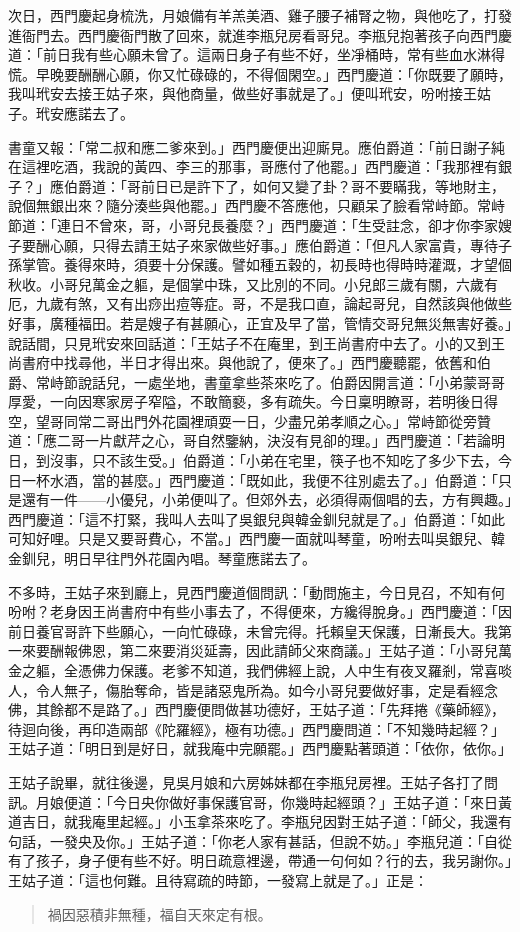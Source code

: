 次日，西門慶起身梳洗，月娘備有羊羔美酒、雞子腰子補腎之物，與他吃了，打發進衙門去。西門慶衙門散了回來，就進李瓶兒房看哥兒。李瓶兒抱著孩子向西門慶道：「前日我有些心願未曾了。這兩日身子有些不好，坐凈桶時，常有些血水淋得慌。早晚要酬酬心願，你又忙碌碌的，不得個閑空。」西門慶道：「你既要了願時，我叫玳安去接王姑子來，與他商量，做些好事就是了。」便叫玳安，吩咐接王姑子。玳安應諾去了。

書童又報：「常二叔和應二爹來到。」西門慶便出迎廝見。應伯爵道：「前日謝子純在這裡吃酒，我說的黃四、李三的那事，哥應付了他罷。」西門慶道：「我那裡有銀子？」應伯爵道：「哥前日已是許下了，如何又變了卦？哥不要瞞我，等地財主，說個無銀出來？隨分湊些與他罷。」西門慶不答應他，只顧呆了臉看常峙節。常峙節道：「連日不曾來，哥，小哥兒長養麼？」西門慶道：「生受註念，卻才你李家嫂子要酬心願，只得去請王姑子來家做些好事。」應伯爵道：「但凡人家富貴，專待子孫掌管。養得來時，須要十分保護。譬如種五穀的，初長時也得時時灌溉，才望個秋收。小哥兒萬金之軀，是個掌中珠，又比別的不同。小兒郎三歲有關，六歲有厄，九歲有煞，又有出痧出痘等症。哥，不是我口直，論起哥兒，自然該與他做些好事，廣種福田。若是嫂子有甚願心，正宜及早了當，管情交哥兒無災無害好養。」說話間，只見玳安來回話道：「王姑子不在庵里，到王尚書府中去了。小的又到王尚書府中找尋他，半日才得出來。與他說了，便來了。」西門慶聽罷，依舊和伯爵、常峙節說話兒，一處坐地，書童拿些茶來吃了。伯爵因開言道：「小弟蒙哥哥厚愛，一向因寒家房子窄隘，不敢簡褻，多有疏失。今日稟明瞭哥，若明後日得空，望哥同常二哥出門外花園裡頑耍一日，少盡兄弟孝順之心。」常峙節從旁贊道：「應二哥一片獻芹之心，哥自然鑒納，決沒有見卻的理。」西門慶道：「若論明日，到沒事，只不該生受。」伯爵道：「小弟在宅里，筷子也不知吃了多少下去，今日一杯水酒，當的甚麼。」西門慶道：「既如此，我便不往別處去了。」伯爵道：「只是還有一件——小優兒，小弟便叫了。但郊外去，必須得兩個唱的去，方有興趣。」西門慶道：「這不打緊，我叫人去叫了吳銀兒與韓金釧兒就是了。」伯爵道：「如此可知好哩。只是又要哥費心，不當。」西門慶一面就叫琴童，吩咐去叫吳銀兒、韓金釧兒，明日早往門外花園內唱。琴童應諾去了。

不多時，王姑子來到廳上，見西門慶道個問訊：「動問施主，今日見召，不知有何吩咐？老身因王尚書府中有些小事去了，不得便來，方纔得脫身。」西門慶道：「因前日養官哥許下些願心，一向忙碌碌，未曾完得。托賴皇天保護，日漸長大。我第一來要酬報佛恩，第二來要消災延壽，因此請師父來商議。」王姑子道：「小哥兒萬金之軀，全憑佛力保護。老爹不知道，我們佛經上說，人中生有夜叉羅剎，常喜啖人，令人無子，傷胎奪命，皆是諸惡鬼所為。如今小哥兒要做好事，定是看經念佛，其餘都不是路了。」西門慶便問做甚功德好，王姑子道：「先拜捲《藥師經》，待迴向後，再印造兩部《陀羅經》，極有功德。」西門慶問道：「不知幾時起經？」王姑子道：「明日到是好日，就我庵中完願罷。」西門慶點著頭道：「依你，依你。」

王姑子說畢，就往後邊，見吳月娘和六房姊妹都在李瓶兒房裡。王姑子各打了問訊。月娘便道：「今日央你做好事保護官哥，你幾時起經頭？」王姑子道：「來日黃道吉日，就我庵里起經。」小玉拿茶來吃了。李瓶兒因對王姑子道：「師父，我還有句話，一發央及你。」王姑子道：「你老人家有甚話，但說不妨。」李瓶兒道：「自從有了孩子，身子便有些不好。明日疏意裡邊，帶通一句何如？行的去，我另謝你。」王姑子道：「這也何難。且待寫疏的時節，一發寫上就是了。」正是：
\begin{quote}
禍因惡積非無種，福自天來定有根。
\end{quote}
